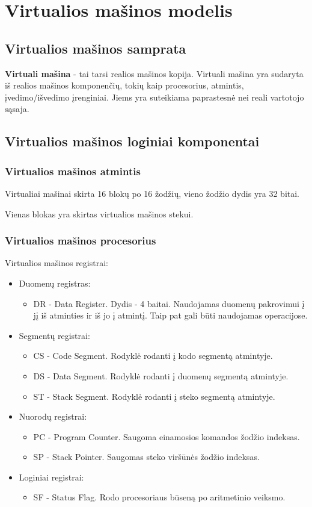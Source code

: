 \section{Virtualios mašinos modelis}
	\subsection{Virtualios mašinos samprata}
	\textbf{Virtuali mašina} - tai tarsi realios mašinos kopija. Virtuali mašina yra sudaryta iš realios mašinos komponenčių, tokių kaip procesorius, atmintis, įvedimo/išvedimo įrenginiai. Jiems yra suteikiama paprastesnė nei reali vartotojo sąsaja.
	
	\subsection{Virtualios mašinos loginiai komponentai}
	\subsubsection{Virtualios mašinos atmintis}
	Virtualiai mašinai skirta 16 blokų po 16 žodžių, vieno žodžio dydis yra 32 bitai.
	
	Vienas blokas yra skirtas virtualios mašinos stekui.
	\subsubsection{Virtualios mašinos procesorius}
	Virtualios mašinos registrai:
	\begin{itemize}
	\item Duomenų registras: 
		\begin{itemize}
		\item DR - Data Register. Dydis - 4 baitai. Naudojamas duomenų pakrovimui į jį iš atminties ir iš jo į atmintį. Taip pat gali būti naudojamas operacijose.
		\end{itemize}
	\item Segmentų registrai:
		\begin{itemize}
		\item CS - Code Segment. Rodyklė rodanti į kodo segmentą atmintyje.
		\item DS - Data Segment. Rodyklė rodanti į duomenų segmentą atmintyje.
		\item ST - Stack Segment. Rodyklė rodanti į steko segmentą atmintyje.
		\end{itemize}
	\item Nuorodų registrai:
		\begin{itemize}
		\item PC - Program Counter. Saugoma einamosios komandos žodžio indeksas.
		\item SP - Stack Pointer. Saugomas steko viršūnės žodžio indeksas.
		\end{itemize}
	\item Loginiai registrai:
		\begin{itemize}
		\item SF - Status Flag. Rodo procesoriaus būseną po aritmetinio veiksmo.
		\end{itemize}
	\end{itemize}
